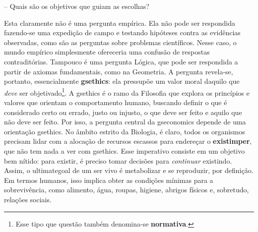 \documentclass[./main.tex]{subfiles}
\begin{document}
-- Quais são os objetivos que guiam as escolhas?

\noindent Esta claramente não é uma pergunta empírica. Ela não pode ser respondida fazendo-se uma expedição de campo e testando hipóteses contra as evidências observadas, como são as perguntas sobre problemas científicos. Nesse caso, o mundo empírico simplesmente ofereceria uma confusão de respostas contraditórias. Tampouco é uma pergunta Lógica, que pode ser respondida a partir de axiomas fundamentais, como na Geometria. A pergunta revela-se, portanto, essencialmente \textbf{\gls{gsethics}}: ela pressupõe um valor moral daquilo que \textit{deve} ser objetivado\footnote{Esse tipo que questão também denomina-se \textbf{normativa}.}. A \gls{gsethics} é o ramo da Filosofia que explora os princípios e valores que orientam o comportamento humano, buscando definir o que é considerado certo ou errado, justo ou injusto, o que deve ser feito e aquilo que não deve ser feito. Por isso, a pergunta central da \gls{gseconomics} depende de uma orientação \gls{gsethics}. No âmbito estrito da Biologia, é claro, todos os organismos precisam lidar com a alocação de recursos escassos para endereçar o \textbf{\gls{existimper}}, que não tem nada a ver com \gls{gsethics}. Esse imperativo consiste em um objetivo bem nítido: para existir, é preciso tomar decisões para \textit{continuar} existindo. Assim, o \gls{ultimategoal} de um ser vivo é metabolizar e se reproduzir, por definição. Em termos humanos, isso implica obter as condições mínimas para a sobrevivência, como alimento, água, roupas, higiene, abrigos físicos e, sobretudo, relações sociais.
\end{document}
